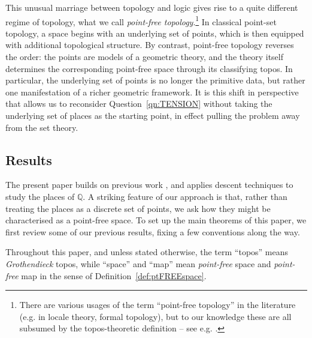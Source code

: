 \documentclass[a4paper, 11pt,reqno]{amsart}
\newcommand{\Q}{\mathbb{Q}}
\begin{document}
This unusual marriage between topology and logic gives rise to a quite different regime of topology, what we call \emph{point-free topology}.\footnote{There are various usages of the term ``point-free topology'' in the literature (e.g. in locale theory, formal topology), but to our knowledge these are all subsumed by the topos-theoretic definition -- see e.g. \cite{ViSublocales}.} In classical point-set topology, a space begins with an underlying set of points, which is then equipped with additional topological structure. By contrast, point-free topology reverses the order: the points are models of a geometric theory, and the theory itself determines the corresponding point-free space through its classifying topos. In particular, the underlying set of points is no longer the primitive data, but rather one manifestation of a richer geometric framework. It is this shift in perspective that allows us to reconsider Question~\ref{qn:TENSION} without taking the underlying set of places as the starting point, in effect pulling the problem away from the set theory. 

 
\subsection{Results}\label{sec:results} The present paper builds on previous work \cite{NV,NVOstrowski}, and applies descent techniques to study the places of $\Q$. A striking feature of our approach is that, rather than treating the places as a discrete set of points, we ask how they might be characterised as a point-free space. To set up the main theorems of this paper, we first review some of our previous results, fixing a few conventions along the way.


\begin{convention} Throughout this paper, and unless stated otherwise, the term ``topos'' means  {\em Grothendieck} topos, while ``space'' and ``map'' mean {\em point-free} space and {\em point-free} map in the sense of Definition~\ref{def:ptFREEspace}. 
\end{convention}
\end{document}

